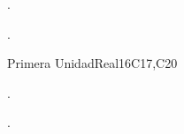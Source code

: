 \begin{syllabus}


\begin{justification}
.%
\end{justification}

\begin{goals}
\item .
\end{goals}

\begin{outcomes}
   \item {}
   \item {}
   \item {}
\end{outcomes}

\begin{competences}
    \item {}
    \item {}
    \item {}
\end{competences}

\begin{unit}{}{Primera Unidad}{Real}{16}{C17,C20}
\begin{topics}
      \item .
\end{topics}

\begin{learningoutcomes}
   \item .
\end{learningoutcomes}
\end{unit}



\begin{coursebibliography}
\end{coursebibliography}

\end{syllabus}
